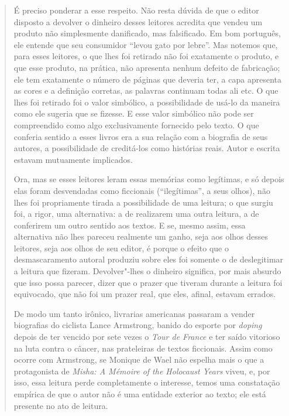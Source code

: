 \begin{quote}
É preciso ponderar a esse respeito. Não resta dúvida de que o editor
disposto a devolver o dinheiro desses leitores acredita que vendeu um
produto não simplesmente danificado, mas falsificado. Em bom português,
ele entende que seu consumidor ``levou gato por lebre''. Mas notemos
que, para esses leitores, o que lhes foi retirado não foi exatamente o
produto, e que esse produto, na prática, não apresenta nenhum defeito de
fabricação; ele tem exatamente o número de páginas que deveria ter, a
capa apresenta as cores e a definição corretas, as palavras continuam
todas ali etc. O que lhes foi retirado foi o valor simbólico, a
possibilidade de usá-lo da maneira como ele sugeria que se fizesse. E
esse valor simbólico não pode ser compreendido como algo exclusivamente
fornecido pelo texto. O que conferia sentido a esses livros era a sua
relação com a biografia de seus autores, a possibilidade de creditá-los
como histórias reais. Autor e escrita estavam mutuamente implicados.

Ora, mas se esses leitores leram essas memórias como legítimas, e só
depois elas foram desvendadas como ficcionais (``ilegítimas'', a seus
olhos), não lhes foi propriamente tirada a possibilidade de uma leitura;
o que surgiu foi, a rigor, uma alternativa: a de realizarem uma outra
leitura, a de conferirem um outro sentido aos textos. E se, mesmo assim,
essa alternativa não lhes pareceu realmente um ganho, seja aos olhos
desses leitores, seja aos olhos de seu editor, é porque o efeito que o
desmascaramento autoral produziu sobre eles foi somente o de
deslegitimar a leitura que fizeram. Devolver"-lhes o dinheiro significa,
por mais absurdo que isso possa parecer, dizer que o prazer que tiveram
durante a leitura foi equivocado, que não foi um prazer real, que eles,
afinal, estavam errados.

De modo um tanto irônico, livrarias americanas passaram a vender
biografias do ciclista Lance Armstrong, banido do esporte por
\emph{doping} depois de ter vencido por sete vezes o \emph{Tour de
France} e ter saído vitorioso na luta contra o câncer, nas prateleiras
de textos ficcionais. Assim como ocorre com Armstrong, se Monique de
Wael não espelha mais o que a protagonista de \emph{Misha: A Mémoire of
the Holocaust Years} viveu, e, por isso, essa leitura perde
completamente o interesse, temos uma constatação empírica de que o autor
não é uma entidade exterior ao texto; ele está presente no ato de
leitura.


\end{quote}
